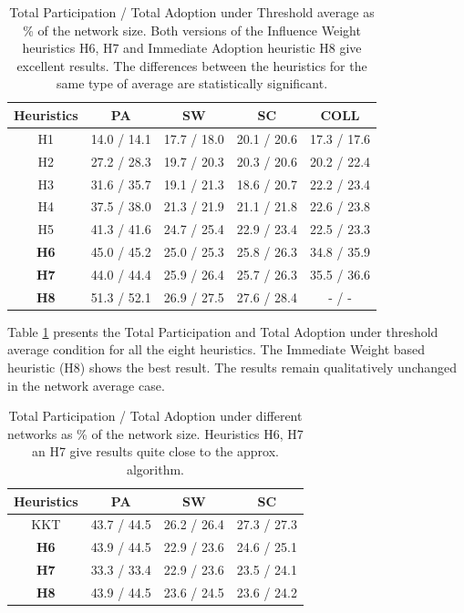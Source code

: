 \documentclass[letterpaper]{article}
\theoremstyle{plain} 		\newtheorem{thm}{Theorem}[section]
\theoremstyle{definition} 	\newtheorem{defn}[thm]{Definition}
\theoremstyle{remark}		\newtheorem{rem}{Remark}
\begin{document}
\begin{table}[htb]\footnotesize
    \centering
    \caption{Total Participation / Total Adoption under Threshold average as \% of the network size. Both versions of the Influence Weight heuristics H6, H7 and Immediate Adoption heuristic H8 give excellent results. The differences between the heuristics for the same type of average are statistically significant.}\label{tab:seed-selection-adoption}
    \begin{tabular}{ccccc} \toprule
        Heuristics & PA & SW & SC & COLL \\ \midrule
        H1 & 14.0 / 14.1 & 17.7 / 18.0 & 20.1 / 20.6 & 17.3 / 17.6 \\
        H2 & 27.2 / 28.3 & 19.7 / 20.3 & 20.3 / 20.6 & 20.2 / 22.4 \\
        H3 & 31.6 / 35.7 & 19.1 / 21.3 & 18.6 / 20.7 & 22.2 / 23.4 \\
        H4 & 37.5 / 38.0 & 21.3 / 21.9 & 21.1 / 21.8 & 22.6 / 23.8 \\
        H5 & 41.3 / 41.6 & 24.7 / 25.4 & 22.9 / 23.4 & 22.5 / 23.3 \\
        \textbf{H6} & 45.0 / 45.2 & 25.0 / 25.3 & 25.8 / 26.3 & 34.8 / 35.9 \\
        \textbf{H7} & 44.0 / 44.4 & 25.9 / 26.4 & 25.7 / 26.3 & 35.5 / 36.6 \\ 
        \textbf{H8} & 51.3 / 52.1 & 26.9 / 27.5 & 27.6 / 28.4 & - / -\\ \bottomrule
    \end{tabular}
\end{table}

Table \ref{tab:seed-selection-adoption} presents the Total Participation and Total Adoption under threshold average condition for all the eight heuristics. The Immediate Weight based heuristic (H8) shows the best result. The results remain qualitatively unchanged in the network average case.



\begin{table}[htb]\footnotesize
    \centering
    \caption{Total Participation / Total Adoption under different networks as \% of the network size. Heuristics H6, H7 an H7 give results quite close to the approx. algorithm.}\label{tab:comp-to-approx}
    \begin{tabular}{cccc} \toprule
        Heuristics & PA & SW & SC \\ \midrule
        KKT & 43.7 / 44.5 & 26.2 / 26.4 & 27.3 / 27.3  \\
        \textbf{H6} & 43.9 / 44.5 & 22.9 / 23.6 & 24.6 / 25.1 \\
        \textbf{H7} & 33.3 / 33.4 & 22.9 / 23.6 & 23.5 / 24.1 \\ 
        \textbf{H8} & 43.9 / 44.5 & 23.6 / 24.5 & 23.6 / 24.2 \\ \bottomrule
    \end{tabular}
\end{table}
\end{document}
